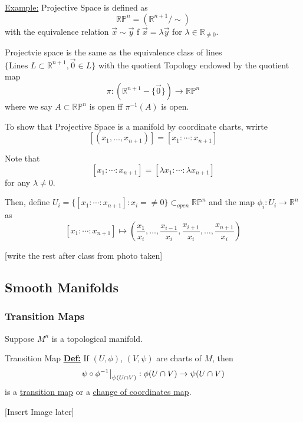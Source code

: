 \documentclass{article}
\newcommand{\restr}[2]{{%
  \left.\kern-\nulldelimiterspace %
  #1 %
  \vphantom{\big|} %
  \right|_{#2} %
  }}
\begin{document}
\vskip 0.5cm
\begin{dottedbox}
  \underline{Example:} Projective Space is defined as 
  \[ \mathbb{R P}^n = (\mathbb{R}^{n+1}/\sim) \]
  with the equivalence relation $\vec{x} \sim \vec{y}$ f $\vec{x} = \lambda \vec{y}$ for $\lambda \in \mathbb{R}_{\neq 0}$.

  \vskip 0.5cm
  Projectvie space is the same as the equivalence class of lines $\{ \text{Lines } L \subset \mathbb{R}^{n+1}, \vec{ 0} \in L \}$ with the quotient Topology endowed by the quotient map
  \[ \pi : (\mathbb{R}^{n+1} - \{ \vec{0} \}) \rightarrow \mathbb{RP}^{n} \]
  where we say $A \subset \mathbb{RP}^{n}$ is open ff $\pi^{-1}(A)$ is open.
\end{dottedbox}

To show that Projective Space is a manifold by coordinate charts, wrirte
\[ [(x_1, \dots, x_{n+1})] = [x_1 : \cdots : x_{n+1}] \]

Note that 
\[ [x_1 : \cdots : x_{n+1}] = [\lambda x_1 : \cdots : \lambda x_{n+1}] \] for any $\lambda \neq 0$.

Then, define $U_i = \{ [x_1 : \cdots : x_{n+1}] : x_i =\neq 0 \} \subset_{open} \mathbb{RP}^n$ and the map $\phi_i : U_i \rightarrow \mathbb{R}^n$ as 
\[ [x_1 : \cdots : x_{n+1}] \mapsto \left( \frac{x_1}{x_i}, \dots,  \frac{x_{i-1}}{x_i},  \frac{x_{i+1}}{x_i}, \dots,  \frac{x_{n+1}}{x_i} \right) \]


[write the rest after class from photo taken]

\vskip 1cm
\subsection{Smooth Manifolds}

\subsubsection{Transition Maps}
Suppose $M^n$ is a topological manifold. 

\begin{mathdefinitionbox}{Transition Map}
\vskip 0.5cm
  \underline{\textbf{Def:}} If $(U,  \phi)$, $(V, \psi)$ are charts of $M$, then 
  \[ \restr{\psi \circ \phi^{-1}}{\psi(U \cap V)} : \phi(U \cap V) \rightarrow \psi(U \cap V)  \] is a \underline{transition map} or a \underline{change of coordinates map}.

  \vskip 0.5cm
  [Insert Image later]

\end{mathdefinitionbox}
\end{document}
